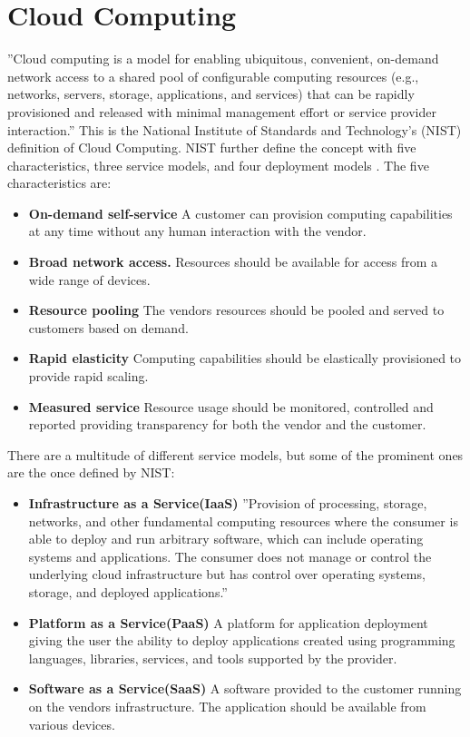 \documentclass[]{uiophd}
\begin{document}
\section{Cloud Computing}
''Cloud computing is a model for enabling ubiquitous, convenient, on-demand network access to a shared pool of configurable computing resources (e.g., networks, servers, storage, applications, and services) that can be rapidly provisioned and released with minimal management effort or service provider interaction.''\cite[p. 2]{Mell:2011:SND:2206223} This is the National Institute of Standards and Technology's (NIST) definition of Cloud Computing. NIST further define the concept with five characteristics, three service models, and four deployment models \cite{Mell:2011:SND:2206223}. The five characteristics are:
\begin{itemize}
\item \textbf{On-demand self-service} A customer can provision computing capabilities at any time without any human interaction with the vendor.
\item \textbf{Broad network access.} Resources should be available for access from a wide range of devices.
\item \textbf{Resource pooling} The vendors resources should be pooled and served to customers based on demand.
\item \textbf{Rapid elasticity} Computing capabilities should be elastically provisioned to provide rapid scaling.
\item \textbf{Measured service} Resource usage should be monitored, controlled and reported providing transparency for both the vendor and the customer.
\end{itemize}

There are a multitude of different service models, but some of the prominent ones are the once defined by NIST:
\begin{itemize}
\item \textbf{Infrastructure as a Service(IaaS)} ''Provision of processing, storage, networks, and other fundamental computing resources where the consumer is able to deploy and run arbitrary software, which can include operating systems and applications. The consumer does not manage or control the underlying cloud infrastructure but has control over operating systems, storage, and deployed applications.''\cite[p. 3]{Mell:2011:SND:2206223}
\item \textbf{Platform as a Service(PaaS)} A platform for application deployment giving the user the ability to deploy applications created using programming languages, libraries, services, and tools supported by the provider.
\item \textbf{Software as a Service(SaaS)} A software provided to the customer running on the vendors infrastructure. The application should be available from various devices.
\end{itemize}
\end{document}
